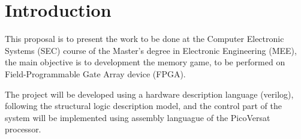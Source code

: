 \section{Introduction}

This proposal is to present the work to be done at the Computer Electronic Systems (SEC) course of the Master's degree in Electronic Engineering (MEE), the main objective is to development the memory game, to be performed on Field-Programmable Gate Array device (FPGA).

\noindent
The project will be developed using a hardware description language (verilog), following the structural logic description model, and the control part of the system will be implemented using assembly languague of the PicoVersat processor.

